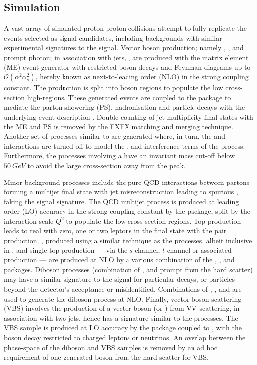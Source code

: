 \subsection{Simulation}

A vast array of simulated proton-proton collisions attempt to fully replicate the events selected as signal candidates, including backgrounds with similar experimental signatures to the signal. Vector boson production; namely \IZvv, \IWlv, \IDYll and prompt photon; in association with jets, \IVj, are produced with the matrix element (ME) event generator \MADGRAPH \cite{Frederix:2018nkq} with restricted boson decays and Feynman diagrams up to $\mathcal{O}(\alpha^2\alpha_s^2)$, hereby known as next-to-leading order (NLO) in the strong coupling constant. The production is split into boson \pt regions to populate the low cross-section high-\pt regions. These generated events are coupled to the \PYTHIA package \cite{Sjostrand:2014zea} to mediate the parton showering (PS), hadronisation and particle decays with the \CUET underlying event description \cite{Khachatryan:2015pea}. Double-counting of jet multiplicity final states with the ME and PS is removed by the FXFX \cite{Frederix:2012ps} matching and merging technique. Another set of processes similar to \IDYll are generated where, in turn, the \PZ and \Pgstar interactions are turned off to model the \PZ, \Pgstar and interference terms of the \IDYll process. Furthermore, the processes involving a \Pgstar have an invariant mass cut-off below ${\SI{50}{GeV}}$ to avoid the large cross-section away from the \PZ peak.

Minor background processes include the pure QCD interactions between partons forming a multijet final state with jet misreconstruction leading to spurious \ptmiss, faking the signal signature. The QCD multijet process is produced at leading order (LO) accuracy in the strong coupling constant by the \PYTHIA package, split by the interaction scale $Q^2$ to populate the low cross-section regions. Top production leads to real \ptmiss with zero, one or two leptons in the final state with the pair production, \Ittj, produced using a similar technique as the \IVj processes, albeit inclusive in \pt, and single top production --- via the $s$-channel, $t$-channel or associated \PW production --- are produced at NLO by a various combination of the \MADGRAPH, \MADSPIN \cite{Artoisenet:2012st}, \PYTHIA and \POWHEG \cite{Alioli:2010xd,Alioli:2009je,Re:2010bp} packages. Diboson processes (combination of \PZ, \PW and prompt \Pgamma from the hard scatter) may have a similar signature to the signal for particular decays, or particles beyond the detector's acceptance or misidentified. Combinations of \MADGRAPH, \MADSPIN, \PYTHIA and \POWHEG are used to generate the diboson process at NLO. Finally, vector boson scattering (VBS) involves the production of a vector boson (\PW or \PZ) from $\mathrm{V}\mathrm{V}$ scattering, in association with two jets, hence has a signature similar to the \IVj processes. The VBS sample is produced at LO accuracy by the \MADGRAPH package coupled to \PYTHIA, with the boson decay restricted to charged leptons or neutrinos. An overlap between the phase-space of the diboson and VBS samples is removed by an ad hoc requirement of one generated boson from the hard scatter for VBS.

